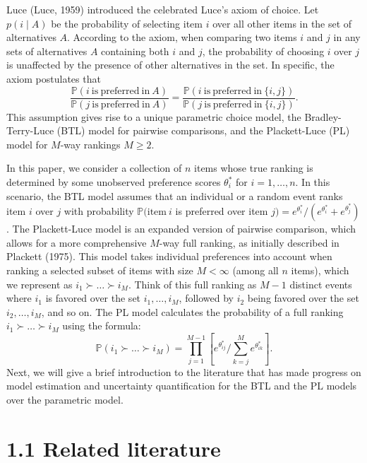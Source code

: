 Luce (Luce, 1959) introduced the celebrated Luce's axiom of choice. Let \(p(i\mid A)\) be the probability of selecting item \(i\) over all other items in the set of alternatives \(A\). According to the axiom, when comparing two items \(i\) and \(j\) in any sets of alternatives \(A\) containing both \(i\) and \(j\), the probability of choosing \(i\) over \(j\) is unaffected by the presence of other alternatives in the set. In specific, the axiom postulates that
\[
\frac{\mathbb{P}(i\mathrm{~is~preferred~in~}A)}{\mathbb{P}(j\mathrm{~is~preferred~in~}A)} = \frac{\mathbb{P}(i\mathrm{~is~preferred~in~}\{i,j\})}{\mathbb{P}(j\mathrm{~is~preferred~in~}\{i,j\})}.
\]
This assumption gives rise to a unique parametric choice model, the Bradley-Terry-Luce (BTL) model for pairwise comparisons, and the Plackett-Luce (PL) model for \(M\)-way rankings \(M\geq 2\).

In this paper, we consider a collection of \(n\) items whose true ranking is determined by some unobserved preference scores \(\theta_{i}^{*}\) for \(i = 1,\dots ,n\). In this scenario, the BTL model assumes that an individual or a random event ranks item \(i\) over \(j\) with probability \(\mathbb{P}(\mathrm{item}~i\) is preferred over item \(j) = e^{\theta_i^*} / (e^{\theta_i^*} + e^{\theta_j^*})\). The Plackett-Luce model is an expanded version of pairwise comparison, which allows for a more comprehensive \(M\)-way full ranking, as initially described in Plackett (1975). This model takes individual preferences into account when ranking a selected subset of items with size \(M< \infty\) (among all \(n\) items), which we represent as \(i_{1}\succ \dots \succ i_{M}\). Think of this full ranking as \(M - 1\) distinct events where \(i_{1}\) is favored over the set \(i_{1},\ldots ,i_{M}\), followed by \(i_{2}\) being favored over the set \(i_{2},\ldots ,i_{M}\), and so on. The PL model calculates the probability of a full ranking \(i_{1}\succ \dots \succ i_{M}\) using the formula:
\[
\mathbb{P}(i_1\succ \dots \succ i_M) = \prod_{j = 1}^{M - 1}\left[e^{\theta_{ij}^*} / \sum_{k = j}^{M}e^{\theta_{ik}^*}\right].
\]
Next, we will give a brief introduction to the literature that has made progress on model estimation and uncertainty quantification for the BTL and the PL models over the parametric model.

\section{1.1 Related literature}\label{related-literature}


